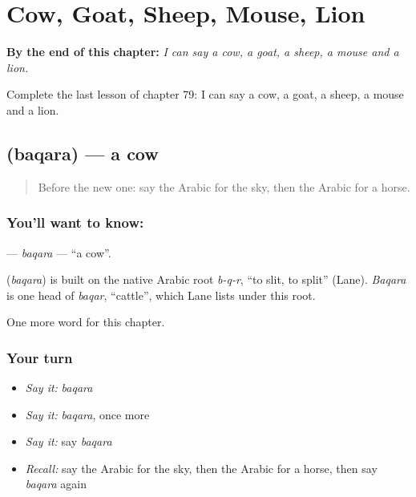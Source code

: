
\chapter{Cow, Goat, Sheep, Mouse, Lion}
\label{ch:ar-cow-goat-sheep-mouse-lion}

\begin{chapteropening}
\textbf{By the end of this chapter:} \emph{I can say a cow, a goat, a sheep, a mouse and a lion.}

Complete the last lesson of chapter 79: I can say a cow, a goat, a sheep, a mouse and a lion.
\end{chapteropening}

\section[\texorpdfstring{\ar{بقرة} (baqara)}{بقرة (baqara)}]{ (baqara) — a cow}

\label{lesson:AR-C79-baqara}



\begin{quote}
Before the new one: say the Arabic for the sky, then the Arabic for a horse.
\end{quote}

\subsection*{You'll want to know: }
\textbf{} — \emph{baqara} — \textquotedblleft{}a cow\textquotedblright{}.

\begin{cousinweb}
\textbf{} (\emph{baqara}) is built on the native Arabic root \emph{b-q-r}, \textquotedblleft{}to slit, to split\textquotedblright{} (Lane). \emph{Baqara} is one head of \emph{baqar}, \textquotedblleft{}cattle\textquotedblright{}, which Lane lists under this root.
\end{cousinweb}

\begin{grammarlens}[title={What you've built}]
One more word for this chapter.
\end{grammarlens}

\subsection*{Your turn}
\begin{itemize}
\raggedright
  \item \emph{Say it:} \emph{baqara}
  \item \emph{Say it:} \emph{baqara}, once more
  \item \emph{Say it:} say \emph{baqara}
  \item \emph{Recall:} say the Arabic for the sky, then the Arabic for a horse, then say \emph{baqara} again
\end{itemize}

